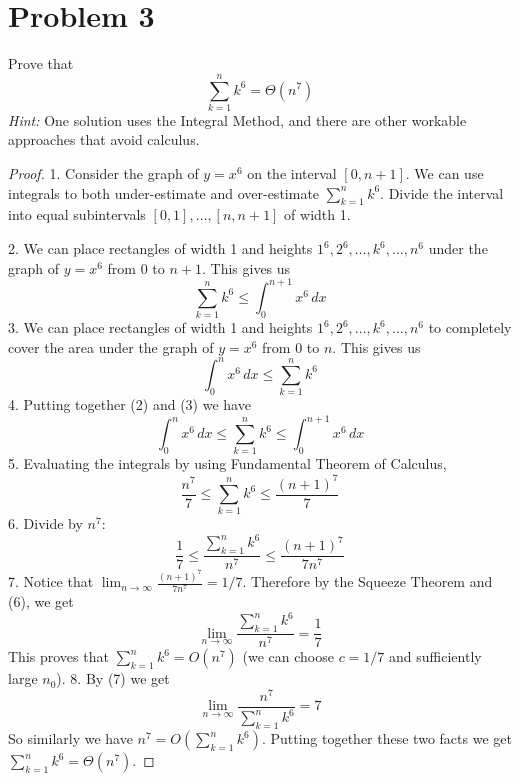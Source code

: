 \documentclass[14pt]{extarticle}
\begin{document}
\section{Problem 3}
Prove that
$$
\sum_{k=1}^n k^6 = \Theta(n^7)
$$
{\it Hint:} One solution uses the Integral Method, and there are other workable approaches that avoid calculus.
\begin{proof}
1. Consider the graph of $y = x^6$ on the interval $[0, n+1]$. We can use integrals to both under-estimate and over-estimate $\sum_{k=1}^n k^6$. Divide the interval into equal subintervals $[0,1], \ldots, [n,n+1]$ of width 1.

2. We can place rectangles of width 1 and heights $1^6, 2^6, \ldots, k^6, \ldots, n^6$ under the graph of $y = x^6$ from $0$ to $n+1$. This gives us
$$
\sum_{k=1}^n k^6 \leq \int_0^{n+1}x^6\,dx
$$
3. We can place rectangles of width 1 and heights $1^6, 2^6, \ldots, k^6, \ldots, n^6$ to completely cover the area under the graph of $y = x^6$ from $0$ to $n$. This gives us
$$
\int_0^{n}x^6\,dx \leq \sum_{k=1}^n k^6
$$
4. Putting together (2) and (3) we have
$$
\int_0^{n}x^6\,dx \leq \sum_{k=1}^n k^6 \leq \int_0^{n+1}x^6\,dx
$$
5. Evaluating the integrals by using Fundamental Theorem of Calculus,
$$
\frac{n^7}{7} \leq \sum_{k=1}^n k^6 \leq \frac{(n+1)^7}{7}
$$
6. Divide by $n^7$:
$$
\frac{1}{7} \leq \frac{\sum_{k=1}^n k^6}{n^7} \leq \frac{(n+1)^7}{7n^7}
$$
7. Notice that $\displaystyle \lim_{n \to \infty} \frac{(n+1)^7}{7n^7} = 1/7$. Therefore by the Squeeze Theorem and (6), we get
$$
\lim_{n \to \infty} \frac{\sum_{k=1}^n k^6}{n^7} = \frac{1}{7}
$$
This proves that $\sum_{k=1}^n k^6 = O(n^7)$ (we can choose $c = 1/7$ and sufficiently large $n_0$).
8. By (7) we get 
$$
\lim_{n \to \infty} \frac{n^7}{\sum_{k=1}^n k^6} = 7
$$
So similarly we have $n^7 = O(\sum_{k=1}^n k^6)$. Putting together these two facts we get $\sum_{k=1}^n k^6 = \Theta(n^7)$.
\end{proof}
\end{document}
